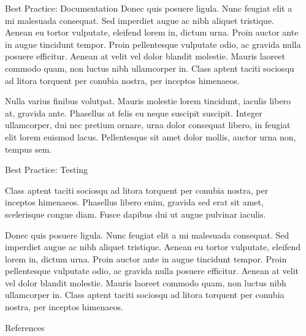 \documentclass[final]{beamer}
\newlength{\sepwidth}
\newlength{\colwidth}
\newcommand{\separatorcolumn}{\begin{column}{\sepwidth}\end{column}}
\begin{document}
\begin{frame}[t]
\begin{columns}[t]
\begin{column}{\colwidth}
\begin{block}{Best Practice: Documentation}
    Donec quis posuere ligula. Nunc feugiat elit a mi malesuada consequat. Sed
    imperdiet augue ac nibh aliquet tristique. Aenean eu tortor vulputate,
    eleifend lorem in, dictum urna. Proin auctor ante in augue tincidunt
    tempor. Proin pellentesque vulputate odio, ac gravida nulla posuere
    efficitur. Aenean at velit vel dolor blandit molestie. Mauris laoreet
    commodo quam, non luctus nibh ullamcorper in. Class aptent taciti sociosqu
    ad litora torquent per conubia nostra, per inceptos himenaeos.

    Nulla varius finibus volutpat. Mauris molestie lorem tincidunt, iaculis
    libero at, gravida ante. Phasellus at felis eu neque suscipit suscipit.
    Integer ullamcorper, dui nec pretium ornare, urna dolor consequat libero,
    in feugiat elit lorem euismod lacus. Pellentesque sit amet dolor mollis,
    auctor urna non, tempus sem.

  \end{block}

  \begin{block}{Best Practice: Testing}

    Class aptent taciti sociosqu ad litora torquent per conubia nostra, per
    inceptos himenaeos. Phasellus libero enim, gravida sed erat sit amet,
    scelerisque congue diam. Fusce dapibus dui ut augue pulvinar iaculis.

    Donec quis posuere ligula. Nunc feugiat elit a mi malesuada consequat. Sed
    imperdiet augue ac nibh aliquet tristique. Aenean eu tortor vulputate,
    eleifend lorem in, dictum urna. Proin auctor ante in augue tincidunt
    tempor. Proin pellentesque vulputate odio, ac gravida nulla posuere
    efficitur. Aenean at velit vel dolor blandit molestie. Mauris laoreet
    commodo quam, non luctus nibh ullamcorper in. Class aptent taciti sociosqu
    ad litora torquent per conubia nostra, per inceptos himenaeos.

  \end{block}

  \begin{block}{References}

    \nocite{*}
    \footnotesize{}

  \end{block}

\end{column}

\separatorcolumn
\end{columns}
\end{frame}
\end{document}
